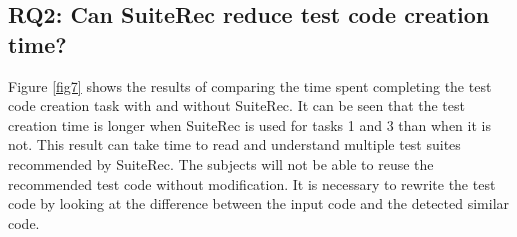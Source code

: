\documentclass[conference]{IEEEtran}
\begin{document}

\subsection{RQ2: Can SuiteRec reduce test code creation time?}
Figure \ref{fig7} shows the results of comparing the time spent completing the test code creation task with and without SuiteRec. It can be seen that the test creation time is longer when SuiteRec is used for tasks 1 and 3 than when it is not. This result can take time to read and understand multiple test suites recommended by SuiteRec. The subjects will not be able to reuse the recommended test code without modification. It is necessary to rewrite the test code by looking at the difference between the input code and the detected similar code. 
\end{document}
